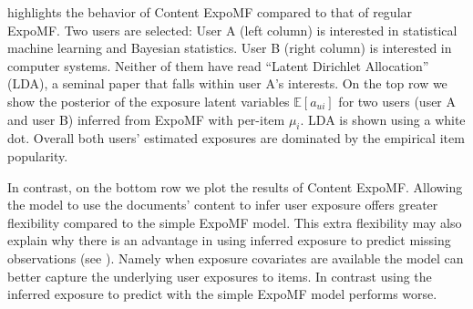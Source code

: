  highlights the behavior of Content ExpoMF compared to that
of regular ExpoMF. Two users are selected: User A (left column) is
interested in statistical machine learning and Bayesian statistics. User B
(right column) is interested in computer systems. Neither of them have
read ``Latent Dirichlet Allocation'' (\gls{LDA}), a seminal paper that falls within user A's
interests. On the top row we show the posterior of the exposure
latent variables $\mathbb{E}[a_{ui}]$ for two users (user A and user B)
inferred from ExpoMF with per-item $\mu_i$. \gls{LDA} is shown using a white dot.
Overall both users' estimated exposures are dominated by the empirical item
popularity. 

In contrast, on the bottom row we plot the results of Content ExpoMF.
Allowing the model to use the documents' content to infer user exposure
offers greater flexibility compared to the simple ExpoMF model. 
This extra flexibility may also explain why there is an advantage in using
inferred exposure to predict missing observations (see ).
Namely when exposure covariates are available the model can better capture the
underlying user exposures to items. In contrast using the inferred exposure to
predict with the simple ExpoMF model performs worse.

